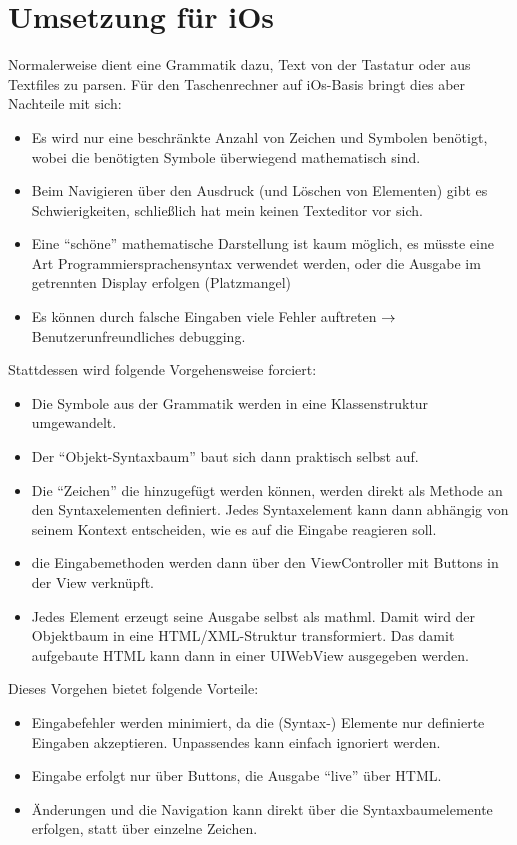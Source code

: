 \section{Umsetzung für iOs}
Normalerweise dient eine Grammatik dazu, Text von der Tastatur oder aus Textfiles zu parsen. Für den Taschenrechner auf iOs-Basis bringt dies aber Nachteile mit sich:
\begin{itemize}
	\item Es wird nur eine beschränkte Anzahl von Zeichen und Symbolen benötigt, 
		wobei die benötigten Symbole überwiegend mathematisch sind.
	\item Beim Navigieren über den Ausdruck (und Löschen von Elementen) gibt es Schwierigkeiten, 
		schließlich hat mein keinen Texteditor vor sich.
	\item Eine ``schöne'' mathematische Darstellung ist kaum möglich, es müsste eine Art Programmiersprachensyntax verwendet werden, oder die Ausgabe im getrennten Display erfolgen (Platzmangel)
	\item Es können durch falsche Eingaben viele Fehler auftreten $\rightarrow$ Benutzerunfreundliches debugging.
\end{itemize}
Stattdessen wird folgende Vorgehensweise forciert:
\begin{itemize}
	\item Die Symbole aus der Grammatik werden in eine Klassenstruktur umgewandelt.
	\item Der ``Objekt-Syntaxbaum'' baut sich dann praktisch selbst auf.
	\item Die ``Zeichen'' die hinzugefügt werden können, werden direkt als Methode an den Syntaxelementen definiert. Jedes Syntaxelement kann dann abhängig von seinem Kontext entscheiden, wie es auf die Eingabe reagieren soll.
	\item die Eingabemethoden werden dann über den ViewController mit Buttons in der View verknüpft.
	\item Jedes Element erzeugt seine Ausgabe selbst als mathml. Damit wird der Objektbaum in eine HTML/XML-Struktur transformiert.  Das damit aufgebaute HTML kann dann in einer UIWebView ausgegeben werden.
\end{itemize}
Dieses Vorgehen bietet folgende Vorteile:
\begin{itemize}
	\item Eingabefehler werden minimiert, da die (Syntax-) Elemente nur definierte Eingaben akzeptieren. Unpassendes kann einfach ignoriert werden.
	\item Eingabe erfolgt nur über Buttons, die Ausgabe ``live'' über HTML.
	\item Änderungen und die Navigation kann direkt über die Syntaxbaumelemente erfolgen, statt über einzelne Zeichen.
\end{itemize}

